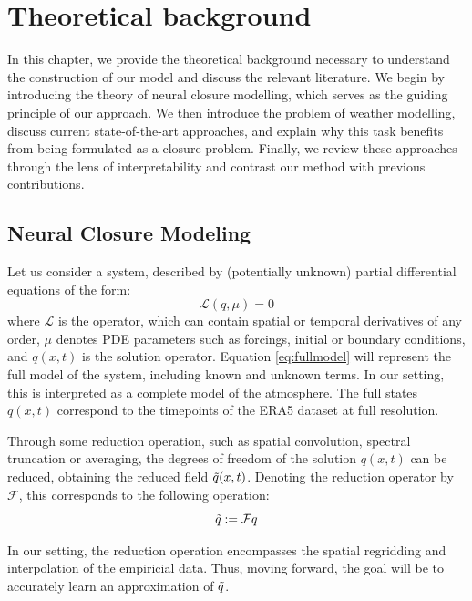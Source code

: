 \chapter{Theoretical background}
\label{LR}
In this chapter, we provide the theoretical background necessary to understand the construction of our model and discuss the relevant literature. We begin by introducing the theory of neural closure modelling, which serves as the guiding principle of our approach. We then introduce the problem of weather modelling, discuss current state-of-the-art approaches, and explain why this task benefits from being formulated as a closure problem. Finally, we review these approaches through the lens of interpretability and contrast our method with previous contributions.

\section{Neural Closure Modeling}
\label{sec:formal_closure}

Let us consider a system, described by (potentially unknown) partial differential equations of the form:
\begin{equation}
    \label{eq:fullmodel}
    \mathcal{L}(q,\mu)=0
\end{equation}
where $\mathcal{L}$ is the operator, which can contain spatial or temporal derivatives of any order, $\mu$ denotes PDE parameters such as forcings, initial or boundary conditions, and $q(x,t)$ is the solution operator. Equation \ref{eq:fullmodel} will represent the full model of the system, including known and unknown terms. In our setting, this is interpreted as a complete model of the atmosphere. The full states $q(x,t)$ correspond to the timepoints of the ERA5 dataset at full resolution.

Through some reduction operation, such as spatial convolution, spectral truncation or averaging, the degrees of freedom of the solution $q(x,t)$ can be reduced, obtaining the reduced field $\Tilde{q}(x,t)$. Denoting the reduction operator by $\mathcal{F}$, this corresponds to the following operation:
\begin{equation}
    \label{eq:reduction}
    \Tilde{q}:=\mathcal{F}q
\end{equation}

In our setting, the reduction operation encompasses the spatial regridding and interpolation of the empiricial data. Thus, moving forward, the goal will be to accurately learn an approximation of $\Tilde{q}$.

